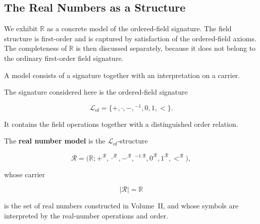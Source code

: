 %

\subsection*{The Real Numbers as a Structure}

\begin{remark*}
We exhibit $\mathbb{R}$ as a concrete model of the ordered-field signature.
The field structure is first-order and is captured by satisfaction of the
ordered-field axioms. The completeness of $\mathbb{R}$ is then discussed
separately, because it does not belong to the ordinary first-order field
signature.
\end{remark*}


\begin{remark*}[Exposition]

A model consists of a signature together with an interpretation on a carrier.

The signature considered here is the ordered-field signature

\[
\mathcal L_{\mathrm{of}}
=
\{+,\cdot,-,{}^{-1},0,1,<\}.
\]

It contains the field operations together with a distinguished order relation.

\end{remark*}


\begin{definition}
\label{def:real-number-model}

The \textbf{real number model} is the
$\mathcal L_{\mathrm{of}}$-structure

\[
\mathcal R
=
\bigl(
\mathbb R;
+^{\mathcal R},
\cdot^{\mathcal R},
-^{\mathcal R},
{}^{-1\,\mathcal R},
0^{\mathcal R},
1^{\mathcal R},
<^{\mathcal R}
\bigr),
\]

whose carrier

\[
|\mathcal R|
=
\mathbb R
\]

is the set of real numbers constructed in Volume~II, and whose symbols are
interpreted by the real-number operations and order.

\end{definition}

